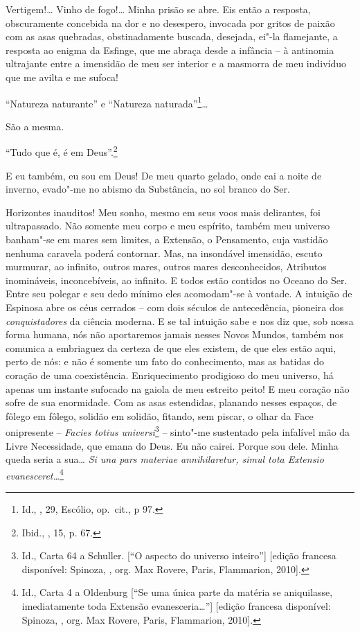 Vertigem!\ldots{} Vinho de fogo!\ldots{} Minha prisão se abre. Eis então a
resposta, obscuramente concebida na dor e no desespero, invocada por
gritos de paixão com as asas quebradas, obstinadamente buscada,
desejada, ei"-la flamejante, a resposta ao enigma da Esfinge, que me
abraça desde a infância -- à antinomia ultrajante entre a imensidão de
meu ser interior e a masmorra de meu indivíduo que me avilta e me
sufoca!

``Natureza naturante'' e ``Natureza naturada''\footnote{Id.,
  {} \scalebox{0.8}{I}, 29, Escólio, op.~cit., p 97.}\ldots{}

São a mesma.

``Tudo que é, é em Deus''.\footnote{Ibid., \scalebox{0.8}{I}, 15, p. 67.}

E eu também, eu sou em Deus! De meu quarto gelado, onde cai a noite de
inverno, evado"-me no abismo da Substância, no sol branco do Ser.

Horizontes inauditos! Meu sonho, mesmo em seus voos mais delirantes, foi
ultrapassado. Não somente meu corpo e meu espírito, também meu universo
banham"-se em mares sem limites, a Extensão, o Pensamento, cuja vastidão
nenhuma caravela poderá contornar. Mas, na insondável imensidão, escuto
murmurar, ao infinito, outros mares, outros mares desconhecidos,
Atributos inomináveis, inconcebíveis, ao infinito. E todos estão
contidos no Oceano do Ser. Entre seu polegar e seu dedo mínimo eles
acomodam"-se à vontade. A intuição de Espinosa abre os céus cerrados --
com dois séculos de antecedência, pioneira dos \emph{conquistadores} da
ciência moderna. E se tal intuição sabe e nos diz que, sob nossa forma
humana, nós não aportaremos jamais nesses Novos Mundos, também nos
comunica a embriaguez da certeza de que eles existem, de que eles estão
aqui, perto de nós: e não é somente um fato do conhecimento, mas as
batidas do coração de uma coexistência. Enriquecimento prodigioso do meu
universo, há apenas um instante sufocado na gaiola de meu estreito
peito! E meu coração não sofre de sua enormidade. Com as asas
estendidas, planando nesses espaços, de fôlego em fôlego, solidão em
solidão, fitando, sem piscar, o olhar da Face onipresente --
\emph{Facies totius universi}\footnote{Id., Carta 64 a Schuller. {[}``O
  aspecto do universo inteiro''{]} {[}edição francesa disponível:
  Spinoza, {}, org. Max Rovere, Paris, \scalebox{0.8}{GF} Flammarion,
  2010{]}.} -- sinto"-me sustentado pela infalível mão da Livre
Necessidade, que emana do Deus. Eu não cairei. Porque sou dele. Minha
queda seria a sua\ldots{} \emph{Si una pars materiae annihilaretur, simul
tota Extensio evanesceret\ldots{}}\footnote{Id., Carta 4 a Oldenburg {[}``Se
  uma única parte da matéria se aniquilasse, imediatamente toda Extensão
  evanesceria\ldots{}''{]} {[}edição francesa disponível: Spinoza,
  {}, org. Max Rovere, Paris, \scalebox{0.8}{GF} Flammarion, 2010{]}.}

